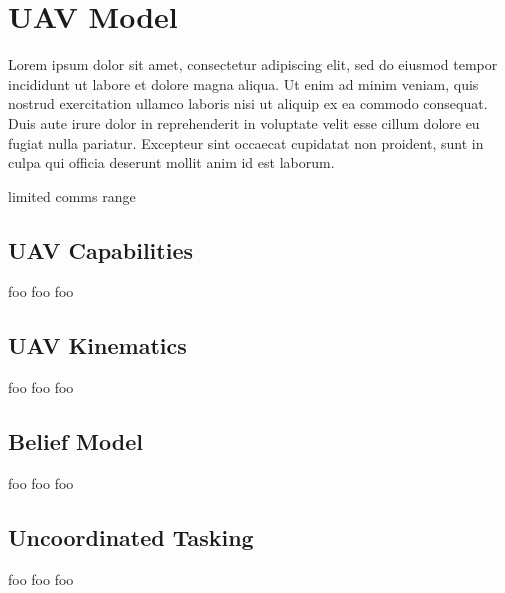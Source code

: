 \chapter{UAV Model}
Lorem ipsum dolor sit amet, consectetur adipiscing elit, sed do eiusmod tempor incididunt ut labore et dolore magna aliqua. Ut enim ad minim veniam, quis nostrud exercitation ullamco laboris nisi ut aliquip ex ea commodo consequat. Duis aute irure dolor in reprehenderit in voluptate velit esse cillum dolore eu fugiat nulla pariatur. Excepteur sint occaecat cupidatat non proident, sunt in culpa qui officia deserunt mollit anim id est laborum.

limited comms range

\section{UAV Capabilities}
foo foo foo
\section{UAV Kinematics}
foo foo foo
\section{Belief Model}
\label{sec:uavBelief}
foo foo foo
\section{Uncoordinated Tasking}
foo foo foo